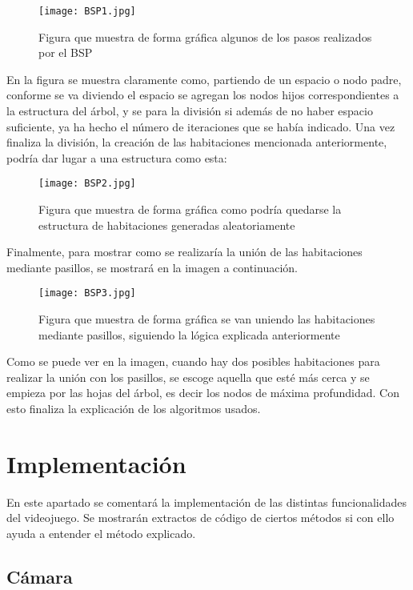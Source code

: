 \begin{figure}[H]
    \centering
    \texttt{[image: BSP1.jpg]}
    \caption{Figura que muestra de forma gráfica algunos de los pasos realizados por el BSP}
\end{figure}

En la figura se muestra claramente como, partiendo de un espacio o nodo padre, conforme se va diviendo el espacio se agregan los nodos hijos correspondientes a la estructura del árbol, y se para la división si además de no haber espacio suficiente, ya ha hecho el número de iteraciones que se había indicado. Una vez finaliza la división, la creación de las habitaciones mencionada anteriormente, podría dar lugar a una estructura como esta:

\begin{figure}[H]
    \centering
    \texttt{[image: BSP2.jpg]}
    \caption{Figura que muestra de forma gráfica como podría quedarse la estructura de habitaciones generadas aleatoriamente}
\end{figure}

Finalmente, para mostrar como se realizaría la unión de las habitaciones mediante pasillos, se mostrará en la imagen a continuación.

\begin{figure}[H]
    \centering
    \texttt{[image: BSP3.jpg]}
    \caption{Figura que muestra de forma gráfica se van uniendo las habitaciones mediante pasillos, siguiendo la lógica explicada anteriormente}
\end{figure}

Como se puede ver en la imagen, cuando hay dos posibles habitaciones para realizar la unión con los pasillos, se escoge aquella que esté más cerca y se empieza por las hojas del árbol, es decir los nodos de máxima profundidad. Con esto finaliza la explicación de los algoritmos usados.

\section{Implementación}
\label{sec:implementacion}

En este apartado se comentará la implementación  de las distintas funcionalidades del videojuego. Se mostrarán extractos de código de ciertos métodos si con ello ayuda a entender el método explicado.


\subsection{Cámara}

